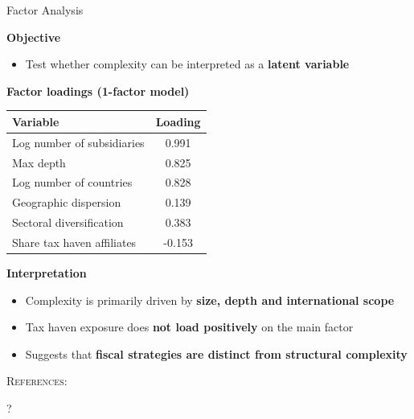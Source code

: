 \documentclass[11pt,aspectratio=169]{beamer}
\begin{document}
  
  \begin{frame}{ Factor Analysis}
  
  \textbf{Objective}
  
  \begin{itemize}
      \item Test whether complexity can be interpreted as a \textbf{latent variable}
  \end{itemize}
  
  \medskip
  
  \textbf{Factor loadings (1-factor model)}
  
  \begin{center}
  \small
  \begin{tabular}{lc}
  \toprule
  Variable & Loading \\
  \midrule
  Log number of subsidiaries & 0.991 \\
  Max depth & 0.825 \\
  Log number of countries & 0.828 \\
  Geographic dispersion & 0.139 \\
  Sectoral diversification & 0.383 \\
  Share tax haven affiliates & -0.153 \\
  \bottomrule
  \end{tabular}
  \end{center}
  
  \medskip
  
  \textbf{Interpretation}
  
  \begin{itemize}
      \item Complexity is primarily driven by \textbf{size, depth and international scope}
      \item Tax haven exposure does \textbf{not load positively} on the main factor
      \item Suggests that \textbf{fiscal strategies are distinct from structural complexity}
  \end{itemize}
  
  \end{frame}

\begin{frame}[allowframebreaks]{\textsc{References:}}
    \tiny
    \printbibliography[heading=none]
\end{frame}



{
\begin{frame}[plain]
  \centering
  {\color{primaryred}\fontsize{150}{150}\selectfont ?}
\end{frame}
}
\end{document}
